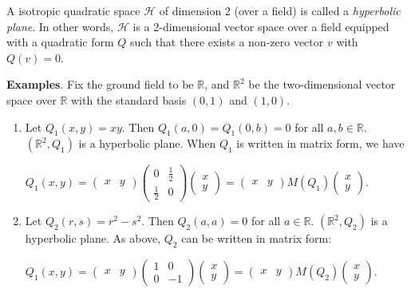\documentclass[12pt]{article}
\begin{document}
A  isotropic quadratic space $\mathcal{H}$ of dimension
2 (over a field) is called a \emph{hyperbolic plane}.  In other
words, $\mathcal{H}$ is a 2-dimensional vector space over a field
equipped with a quadratic form $Q$ such that there exists a non-zero
vector $v$ with $Q(v)=0$.

\textbf{Examples}.  Fix the ground field to be $\mathbb{R}$, and
$\mathbb{R}^2$ be the two-dimensional vector space over $\mathbb{R}$
with the standard basis $(0,1)$ and $(1,0)$.
\begin{enumerate}
\item Let $Q_1(x,y)=xy$.  Then $Q_1(a,0)=Q_1(0,b)=0$ for all $a,b\in\mathbb{R}$.  $(\mathbb{R}^2,Q_1)$ is a hyperbolic
plane.  When $Q_1$ is written in matrix form, we have
\begin{center}$Q_1(x,y) =
\begin{pmatrix}x & y\end{pmatrix}
\begin{pmatrix}
0 & \frac{1}{2} \\
\frac{1}{2} & 0
\end{pmatrix}
\begin{pmatrix}x \\ y\end{pmatrix}=
\begin{pmatrix}x & y\end{pmatrix}
M(Q_1)
\begin{pmatrix}x \\ y\end{pmatrix}.$
\end{center}
\item Let $Q_2(r,s)=r^2-s^2$.  Then $Q_2(a,a)=0$ for all $a\in\mathbb{R}$.  $(\mathbb{R}^2,Q_2)$ is a hyperbolic
plane.  As above, $Q_2$ can be written in matrix form:
\begin{center}$Q_1(x,y) =
\begin{pmatrix}x & y\end{pmatrix}
\begin{pmatrix}
1 & 0 \\
0 & -1
\end{pmatrix}
\begin{pmatrix}x \\ y\end{pmatrix}=
\begin{pmatrix}x & y\end{pmatrix}
M(Q_2)
\begin{pmatrix}x \\ y\end{pmatrix}.$
\end{center}
\end{enumerate}
\end{document}

